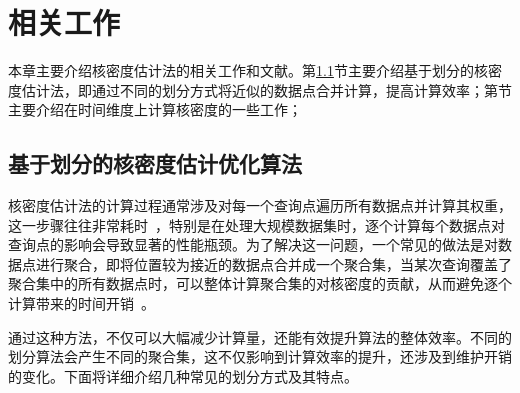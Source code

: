 \chapter{相关工作}

本章主要介绍核密度估计法的相关工作和文献。第\ref{sec:2.1}节主要介绍基于划分的核密度估计法，即通过不同的划分方式将近似的数据点合并计算，提高计算效率；第\label{sec:2.2}节主要介绍在时间维度上计算核密度的一些工作；

\section{基于划分的核密度估计优化算法}
\label{sec:2.1}

核密度估计法的计算过程通常涉及对每一个查询点遍历所有数据点并计算其权重，这一步骤往往非常耗时~\cite{gramacki_nonparametric_2018}，特别是在处理大规模数据集时，逐个计算每个数据点对查询点的影响会导致显著的性能瓶颈。为了解决这一问题，一个常见的做法是对数据点进行聚合，即将位置较为接近的数据点合并成一个聚合集，当某次查询覆盖了聚合集中的所有数据点时，可以整体计算聚合集的对核密度的贡献，从而避免逐个计算带来的时间开销~\cite{liu_immens_2013}。

通过这种方法，不仅可以大幅减少计算量，还能有效提升算法的整体效率。不同的划分算法会产生不同的聚合集，这不仅影响到计算效率的提升，还涉及到维护开销的变化。下面将详细介绍几种常见的划分方式及其特点。

